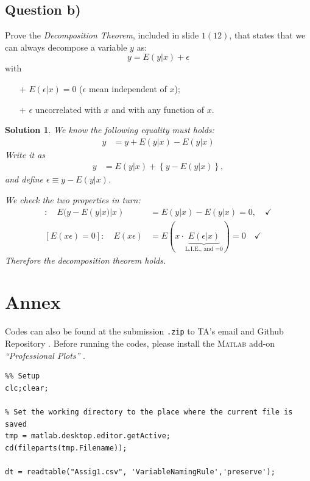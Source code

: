\documentclass[9pt]{tufte-handout}
\newcommand{\inline}[1]{$ #1 $}
\newcommand{\problem}[1]{{\color{gray} #1}}
\newcommand{\solution}[1]{{\color{NavyBlue} #1}}
\newcommand{\lrbbbkt}[1]{\left\{ #1 \right\}}
\newcommand{\qedblack}{\hfill \blacksquare}
\newtheorem*{Solution}{Solution}
\begin{document}
\subsection{Question b)}
\problem{Prove the \textit{Decomposition Theorem}, included in slide $1(12)$, that states that we can always decompose a variable $y$ as:
$$
y=E(y \vert x)+\epsilon
$$
with 
\begin{enumerate}
	\item [+] $E(\epsilon \vert x)=0$ ($\epsilon$ mean independent of $x$);
	\item [+] $\epsilon$ uncorrelated with $x$ and with any function of $x$.
\end{enumerate}
}
\solution{\begin{Solution}
	\normalfont
	We know the following equality must holds:
	\begin{align*}
		y &= y+E(y|x)-E(y|x)
	\end{align*}
	Write it as
	\begin{align*}
		y&=E(y|x)+\lrbbbkt{y-E(y|x)},
	\end{align*}
	and define \inline{\epsilon \equiv y-E(y|x)}.\par 
	\noindent We check the two properties in turn:
	\begin{align*}
		[E(\epsilon | x)=0]: \quad E(y-E(y|x)|x) &= E(y|x)-E(y|x)=0, \quad \checkmark \\ [E(x\epsilon)=0]: \quad E(x\epsilon) &=E(x\cdot \underbrace{E(\epsilon | x)}_{\text{L.I.E., and =0}}) =0 \quad \checkmark
	\end{align*}
	Therefore the decomposition theorem holds.
	\qedblack
\end{Solution}
}

\newpage
\section{Annex}

 Codes can also be found at the submission \texttt{.zip} to TA's email and Github Repository . Before running the codes, please install the \textsc{Matlab} add-on \textit{``Professional Plots''} \citep{atharva2021}.
\vspace{3cm}
\begin{lstlisting}
%% Setup
clc;clear;

% Set the working directory to the place where the current file is saved
tmp = matlab.desktop.editor.getActive;
cd(fileparts(tmp.Filename));

dt = readtable("Assig1.csv", 'VariableNamingRule','preserve');
\end{lstlisting}
\end{document}
